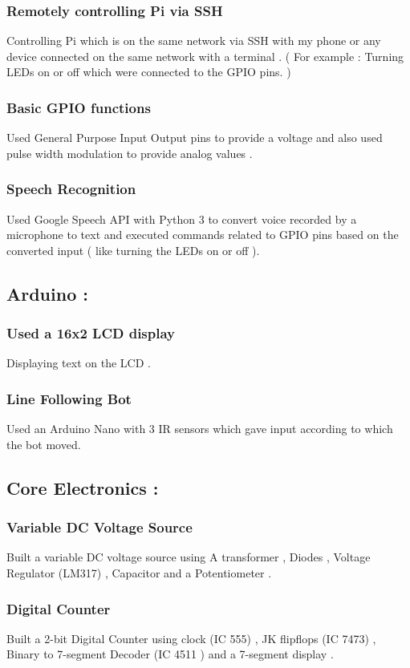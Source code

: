 \documentclass{article}
\begin{document}
    \subsubsection{Remotely controlling Pi via SSH}
    Controlling Pi which is on the same network via SSH with my phone or any device connected on the same network with a terminal .
    ( For example : Turning LEDs on or off which were connected to the GPIO pins. ) 
    \subsubsection{Basic GPIO functions}
    Used General Purpose Input Output pins to provide a voltage and also used pulse width modulation to provide analog values .
    \subsubsection{Speech Recognition}
    Used Google Speech API with Python 3 to convert voice recorded by a microphone
    to text and executed commands related to GPIO pins based on the converted input ( like turning the LEDs on or off ).
    \subsection{Arduino :}
    \subsubsection{Used a 16x2 LCD display}
    Displaying text on the LCD .
    \subsubsection{Line Following Bot}
    Used an Arduino Nano with 3 IR sensors which gave input according to which the bot moved. 
    \subsection{Core Electronics :}
    \subsubsection{Variable DC Voltage Source}
    Built a variable DC voltage source using A transformer , Diodes , Voltage Regulator (LM317) , Capacitor and a Potentiometer .
    \subsubsection{Digital Counter}
    Built a 2-bit Digital Counter using clock (IC 555) , JK flipflops (IC 7473) , Binary to 7-segment Decoder (IC 4511 ) and a 7-segment display .
    
    
    
     
\end{document}
